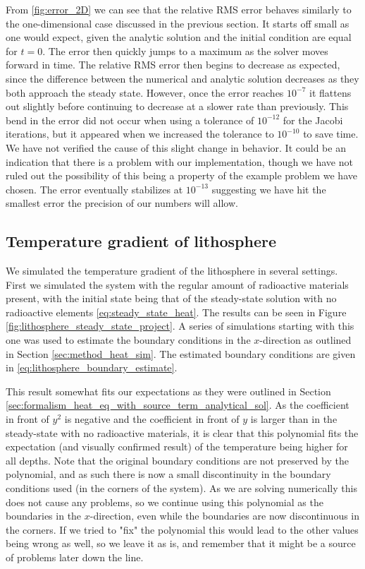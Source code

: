 \documentclass[reprint,english,notitlepage]{revtex4-1}  %
\begin{document}
From \autoref{fig:error_2D} we can see that the relative RMS error behaves similarly to the one-dimensional case discussed in the previous section. It starts off small as one would expect, given the analytic solution and the initial condition are equal for \(t=0\). The error then quickly jumps to a maximum as the solver moves forward in time. The relative RMS error then begins to decrease as expected, since the difference between the numerical and analytic solution decreases as they both approach the steady state. However, once the error reaches \(10^{-7}\) it flattens out slightly before continuing to decrease at a slower rate than previously. This bend in the error did not occur when using a tolerance of \(10^{-12}\) for the Jacobi iterations, but it appeared when we increased the tolerance to \(10^{-10}\) to save time. We have not verified the cause of this slight change in behavior. It could be an indication that there is a problem with our implementation, though we have not ruled out the possibility of this being a property of the example problem we have chosen. The error eventually stabilizes at \(10^{-13}\) suggesting we have hit the smallest error the precision of our numbers will allow.


\subsection{Temperature gradient of lithosphere} \label{sec:discussion_lithosphere}

We simulated the temperature gradient of the lithosphere in several settings. First we simulated the system with the regular amount of radioactive materials present, with the initial state being that of the steady-state solution with no radioactive elements \eqref{eq:steady_state_heat}. The results can be seen in Figure \ref{fig:lithosphere_steady_state_project}. A series of simulations starting with this one was used to estimate the boundary conditions in the $x$-direction as outlined in Section \ref{sec:method_heat_sim}. The estimated boundary conditions are given in \eqref{eq:lithosphere_boundary_estimate}. 

This result somewhat fits our expectations as they were outlined in Section \ref{sec:formalism_heat_eq_with_source_term_analytical_sol}. 
As the coefficient in front of $y^2$ is negative and the coefficient in front of $y$ is larger than in the steady-state with no radioactive materials, it is clear that this polynomial fits the expectation (and visually confirmed result) of the temperature being higher for all depths. Note that the original boundary conditions are not preserved by the polynomial, and as such there is now a small discontinuity in the boundary conditions used (in the corners of the system). As we are solving numerically this does not cause any problems, so we continue using this polynomial as the boundaries in the $x$-direction, even while the boundaries are now discontinuous in the corners. If we tried to "fix" the polynomial this would lead to the other values being wrong as well, so we leave it as is, and remember that it might be a source of problems later down the line. 
\end{document}
